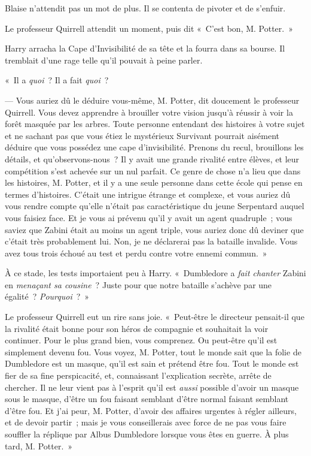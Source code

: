 Blaise n'attendit pas un mot de plus.
Il se contenta de pivoter et de s'enfuir.

\later

Le professeur Quirrell attendit un moment, puis dit «~C'est bon, M. Potter.~»

Harry arracha la Cape d'Invisibilité de sa tête et la fourra dans sa bourse.
Il tremblait d'une rage telle qu'il pouvait à peine parler.

«~Il a \emph{quoi}~?
Il a fait \emph{quoi}~?

--- Vous auriez dû le déduire vous-même, M. Potter, dit doucement le professeur Quirrell.
Vous devez apprendre à brouiller votre vision jusqu'à réussir à voir la forêt masquée par les arbres.
Toute personne entendant des histoires à votre sujet et ne sachant pas que vous étiez le mystérieux Survivant pourrait aisément déduire que vous possédez une cape d'invisibilité.
Prenons du recul, brouillons les détails, et qu'observons-nous~?
Il y avait une grande rivalité entre élèves, et leur compétition s'est achevée sur un nul parfait.
Ce genre de chose n'a lieu que dans les histoires, M. Potter, et il y a une seule personne dans cette école qui pense en termes d'histoires.
C'était une intrigue étrange et complexe, et vous auriez dû vous rendre compte qu'elle n'était pas caractéristique du jeune Serpentard auquel vous faisiez face.
Et je vous ai prévenu qu'il y avait un agent quadruple~; vous saviez que Zabini était au moins un agent triple, vous auriez donc dû deviner que c'était très probablement lui.
Non, je ne déclarerai pas la bataille invalide.
Vous avez tous trois échoué au test et perdu contre votre ennemi commun.~»

À ce stade, les tests importaient peu à Harry.
«~Dumbledore a \emph{fait chanter} Zabini en \emph{menaçant sa cousine}~?
Juste pour que notre bataille s'achève par une égalité~?
\emph{Pourquoi}~?~»

Le professeur Quirrell eut un rire sans joie.
«~Peut-être le directeur pensait-il que la rivalité était bonne pour son héros de compagnie et souhaitait la voir continuer.
Pour le plus grand bien, vous comprenez.
Ou peut-être qu'il est simplement devenu fou.
Vous voyez, M. Potter, tout le monde sait que la folie de Dumbledore est un masque, qu'il est sain et prétend être fou.
Tout le monde est fier de sa fine perspicacité, et, connaissant l'explication secrète, arrête de chercher.
Il ne leur vient pas à l'esprit qu'il est \emph{aussi} possible d'avoir un masque sous le masque, d'être un fou faisant semblant d'être normal faisant semblant d'être fou.
Et j'ai peur, M. Potter, d'avoir des affaires urgentes à régler ailleurs, et de devoir partir~; mais je vous conseillerais avec force de ne pas vous faire souffler la réplique par Albus Dumbledore lorsque vous êtes en guerre.
À plus tard, M. Potter.~»

